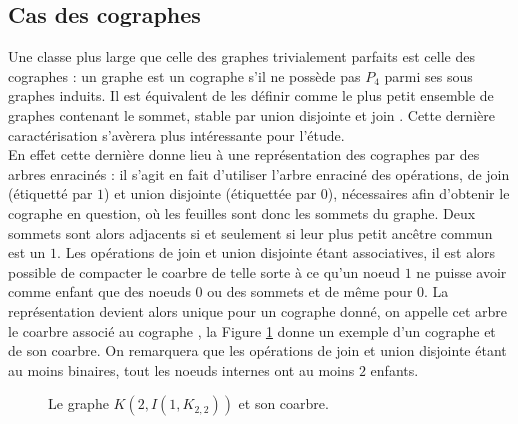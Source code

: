 \documentclass{scrartcl}
\begin{document}
\begin{flushleft}
\subsection{Cas des cographes}

Une classe plus large que celle des graphes trivialement parfaits est celle des cographes : un graphe est un cographe s'il ne possède pas
$P_4$ parmi ses sous graphes induits. Il est équivalent de les définir comme le plus petit ensemble de graphes contenant le sommet, stable par
union disjointe et join \cite{cotrees}. Cette dernière caractérisation s'avèrera plus intéressante pour l'étude.\\

En effet cette dernière donne lieu à une représentation des cographes par des arbres enracinés : il s'agit en fait d'utiliser l'arbre
enraciné des opérations, de join (étiquetté par $1$) et union disjointe (étiquettée par $0$), nécessaires afin d'obtenir le cographe en question,
où les feuilles sont donc les sommets du graphe. Deux sommets sont alors adjacents si et seulement si leur plus petit ancêtre commun est un $1$.
Les opérations de join et union disjointe étant associatives, il est alors possible de compacter le coarbre de telle sorte à ce qu'un noeud
$1$ ne puisse avoir comme enfant que des noeuds $0$ ou des sommets et de même pour $0$. La représentation devient alors unique pour un cographe
donné, on appelle cet arbre le coarbre associé au cographe \cite{cotrees}, la Figure \ref{excographe} donne un exemple d'un cographe et de
son coarbre. On remarquera que les opérations de join et union disjointe étant au moins binaires, tout les noeuds internes ont au moins
$2$ enfants. 

\begin{figure}[h]
    \caption{Le graphe $K(2,I(1,K_{2,2}))$ et son coarbre.}\label{excographe}
    \vspace*{0.5cm}
    \begin{center}
\end{center}
\end{figure}
\end{flushleft}
\end{document}
